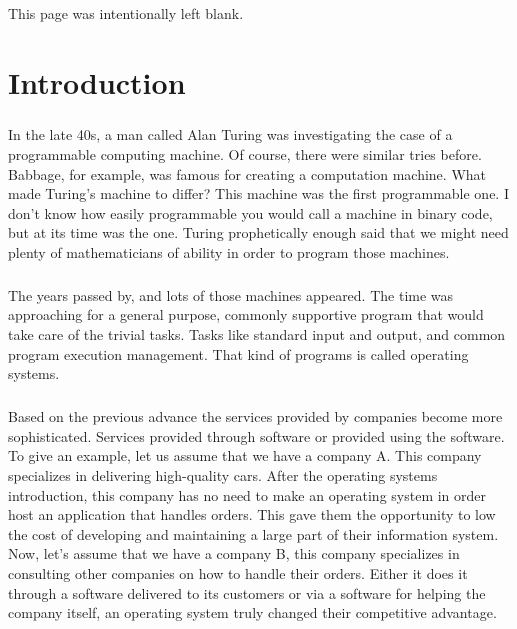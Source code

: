 \newpage
\begin{center}
	This page was intentionally left blank.
\end{center}
\newpage
\chapter{Introduction}
\paragraph{} In the late 40s, a man called Alan Turing was investigating the case of a programmable computing machine. Of course, there were similar tries before. Babbage, for example, was famous for creating a computation machine. What made Turing's machine to differ? This machine was the first programmable one. I don't know how easily programmable you would call a machine in binary code, but at its time was the one. Turing prophetically enough said that we might need plenty of mathematicians of ability in order to program those machines.

\paragraph{} The years passed by, and lots of those machines appeared. The time was approaching for a general purpose, commonly supportive program that would take care of the trivial tasks. Tasks like standard input and output, and common program execution management. That kind of programs is called operating systems.

\paragraph{} Based on the previous advance the services provided by companies become more sophisticated. Services provided through software or provided using the software. To give an example, let us assume that we have a company A. This company specializes in delivering high-quality cars. After the operating systems introduction, this company has no need to make an operating system in order host an application that handles orders. This gave them the opportunity to low the cost of developing and maintaining a large part of their information system. Now, let's assume that we have a company B, this company specializes in consulting other companies on how to handle their orders. Either it does it through a software delivered to its customers or via a software for helping the company itself, an operating system truly changed their competitive advantage.

